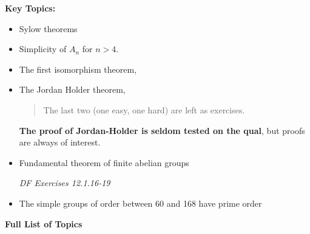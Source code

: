 \textbf{Key Topics:}

\begin{itemize}
\item
  Sylow theorems
\item
  Simplicity of \(A_n\) for \(n > 4\).
\item
  The first isomorphism theorem,
\item
  The Jordan Holder theorem,

  \begin{quote}
  The last two (one easy, one hard) are left as exercises.
  \end{quote}

  \textbf{The proof of Jordan-Holder is seldom tested on the qual}, but
  proofs are always of interest.
\item
  Fundamental theorem of finite abelian groups

  \emph{DF Exercises 12.1.16-19}
\item
  The simple groups of order between 60 and 168 have prime order
\end{itemize}

\textbf{Full List of Topics}

